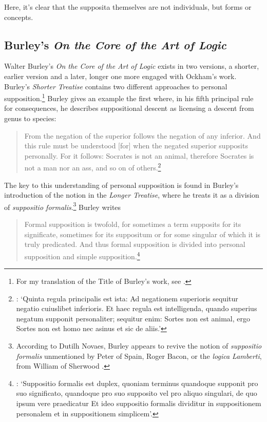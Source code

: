 \documentclass[a4paper, 11pt]{article}
\begin{document}
Here, it's clear that the supposita themselves are not individuals, but forms or concepts.

\subsection{Burley's \emph{On the Core of the Art of Logic}}
Walter Burley's \emph{On the Core of the Art of Logic} exists in two versions, a shorter, earlier version and a later, longer one more engaged with Ockham's work. Burley's \emph{Shorter Treatise} contains two different approaches to personal supposition.\footnote{For my translation of the Title of Burley's work, see \autocite{SpadeMenn}.} Burley gives an example the first where, in his fifth principal rule for consequences, he describes suppositional descent as licensing a descent from genus to species:

\begin{quote}
From the negation of the superior follows the negation of any inferior. And this rule must be understood [for] when the negated superior supposits personally. For it follows: Socrates is not an animal, therefore Socrates is not a man nor an ass, and so on of others.\footnote{\autocite[209.35-210.2]{BurleyDPAL}: `Quinta regula principalis est ista: Ad negationem superioris sequitur negatio cuiuslibet inferioris. Et haec regula est intelligenda, quando superius negatum supponit personaliter; sequitur enim: Sortes non est animal, ergo Sortes non est homo nec asinus et sic de aliis.'}
\end{quote} 
The key to this understanding of personal supposition is found in Burley's introduction of the notion in the \emph{Longer Treatise}, where he treats it as a division of \emph{suppositio formalis}.\footnote{According to Dutilh Novaes, Burley appears to revive the notion of \emph{suppositio formalis} unmentioned by Peter of Spain, Roger Bacon, or the \emph{logica Lamberti}, from William of Sherwood \autocite[360]{DutilhNovaes2012c}.} Burley writes
\begin{quote}
Formal supposition is twofold, for sometimes a term supposits for its significate, sometimes for its suppositum or for some singular of which it is truly predicated. And thus formal supposition is divided into personal supposition and simple supposition.\footnote{\autocite[3.1-5]{BurleyDPAL}: `Suppositio formalis est duplex, quoniam terminus quandoque supponit pro suo significato, quandoque pro suo supposito vel pro aliquo singulari, de quo ipsum vere praedicatur Et ideo suppositio formalis dividitur in suppositionem personalem et in suppositionem simplicem'.}
\end{quote}
\end{document}
